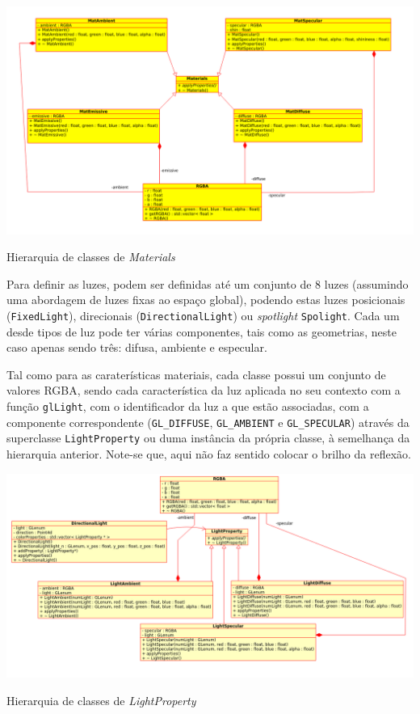 \begin{center} 	
\includegraphics[width=\textwidth,height=\textheight,keepaspectratio]{resources/material.png}
\captionsetup{type=figure, width=0.8\linewidth}
\caption{Hierarquia de classes de \emph{Materials}} 
\label{fig:ssec2:mat} 
\end{center}

Para definir as luzes, podem ser definidas até um conjunto de 8 luzes (assumindo
uma abordagem de luzes fixas ao espaço global), podendo estas luzes posicionais 
(\texttt{FixedLight}), direcionais (\texttt{DirectionalLight}) ou
\emph{spotlight} \texttt{Spolight}. Cada um desde tipos de luz pode ter várias
componentes, tais como as geometrias, neste caso apenas sendo três: difusa,
ambiente e especular.

Tal como para as caraterísticas materiais, cada classe possui um conjunto de
valores RGBA, sendo cada característica da luz aplicada no seu contexto com
a função \texttt{glLight}, com o identificador da luz a que estão associadas,
com a componente correspondente (\texttt{GL\_DIFFUSE}, \texttt{GL\_AMBIENT}
e \texttt{GL\_SPECULAR}) através da superclasse \texttt{LightProperty} ou duma
instância da própria classe, à semelhança da hierarquia anterior. Note-se que,
aqui não faz sentido colocar o brilho da reflexão.


\begin{center} 	
\includegraphics[width=\textwidth,height=\textheight,keepaspectratio]{resources/lightProperties.png}
\captionsetup{type=figure, width=0.8\linewidth}
\caption{Hierarquia de classes de \emph{LightProperty}} 
\label{fig:ssec2:props} 
\end{center}

